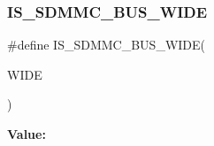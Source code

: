 \subsubsection{\texorpdfstring{IS\_SDMMC\_BUS\_WIDE}{IS\_SDMMC\_BUS\_WIDE}}
{\footnotesize\ttfamily \#define I\+S\+\_\+\+S\+D\+M\+M\+C\+\_\+\+B\+U\+S\+\_\+\+W\+I\+DE(\begin{DoxyParamCaption}\item[{}]{W\+I\+DE }\end{DoxyParamCaption})}

{\bfseries Value\+:}
\begin{DoxyCode}{0}

\end{DoxyCode}
